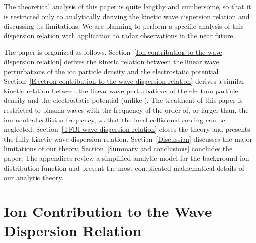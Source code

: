 \documentclass[draft]{agujournal2019}
\begin{document}
The theoretical analysis of this paper is quite lengthy and cumbersome, so
that it is restricted only to analytically deriving the kinetic wave
dispersion relation and discussing its limitations. We are planning to perform
a specific analysis of this dispersion relation with application to radar
observations in the near future.

The paper is organized as follows.
Section~\ref{Ion contribution to the wave dispersion relation} derives the
kinetic relation between the linear wave perturbations of the ion particle
density and the electrostatic potential.
Section~\ref{Electron contribution to the wave dispersion relation} derives a
similar kinetic relation between the linear wave perturbations of the electron
particle density and the electrostatic potential (unlike 
). The treatment of this paper is restricted
to plasma waves with the frequency of the order of, or larger than, the ion-neutral
collision frequency, so that the local collisional cooling can be neglected. 
Section~\ref{TFBI wave dispersion relation} closes the
theory and presents the fully kinetic wave dispersion relation.
Section~\ref{Discussion} discusses the major limitations of our theory.
Section~\ref{Summary and conclusions} concludes the paper. The appendices 
review a simplified analytic model for the background ion distribution function \cite{Koontaweepunya:Non-Maxwellian24} and 
present the most complicated mathematical details of our analytic theory.

\section{Ion Contribution to the Wave Dispersion
Relation\label{Ion contribution to the wave dispersion relation}}
\end{document}
